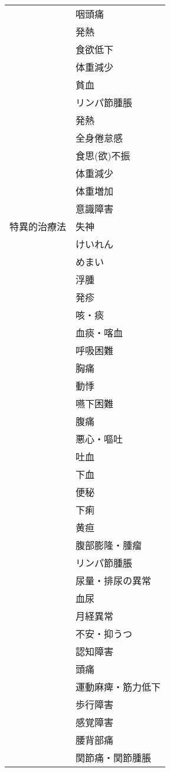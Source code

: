 \begin{xltabular}{\linewidth}{XX}
 & 咽頭痛 \\
 & 発熱 \\
 & 食欲低下 \\
 & 体重減少 \\
 & 貧血 \\
 & リンパ節腫脹 \\
 & 発熱 \\
 & 全身倦怠感 \\
 & 食思(欲)不振 \\
 & 体重減少 \\
 & 体重増加 \\
 & 意識障害 \\
特異的治療法 & 失神 \\
 & けいれん \\
 & めまい \\
 & 浮腫 \\
 & 発疹 \\
 & 咳・痰 \\
 & 血痰・喀血 \\
 & 呼吸困難 \\
 & 胸痛 \\
 & 動悸 \\
 & 嚥下困難 \\
 & 腹痛 \\
 & 悪心・嘔吐 \\
 & 吐血 \\
 & 下血 \\
 & 便秘 \\
 & 下痢 \\
 & 黄疸 \\
 & 腹部膨隆・腫瘤 \\
 & リンパ節腫脹 \\
 & 尿量・排尿の異常 \\
 & 血尿 \\
 & 月経異常 \\
 & 不安・抑うつ \\
 & 認知障害 \\
 & 頭痛 \\
 & 運動麻痺・筋力低下 \\
 & 歩行障害 \\
 & 感覚障害 \\
 & 腰背部痛 \\
 & 関節痛・関節腫脹 \\
\bottomrule
\end{xltabular}


